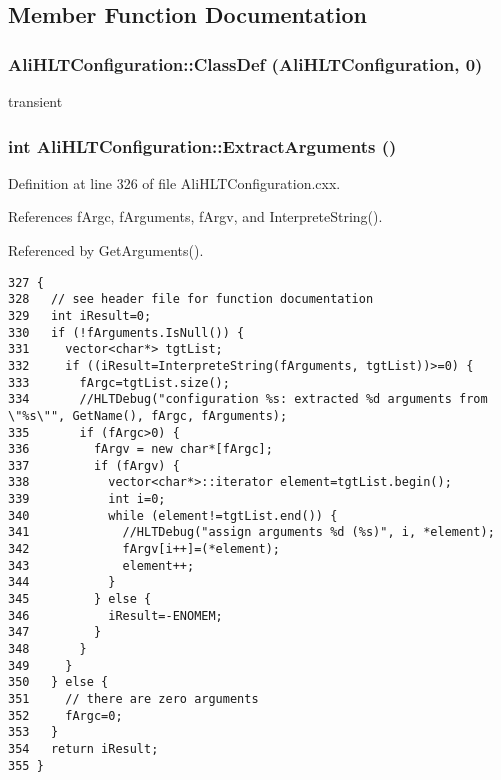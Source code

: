 \subsection{Member Function Documentation}
\subsubsection{\setlength{\rightskip}{0pt plus 5cm}Ali\-HLTConfiguration::Class\-Def ({\bf Ali\-HLTConfiguration}, 0)\hspace{0.3cm}{\tt  [private]}}\label{classAliHLTConfiguration_d3}


transient 

\subsubsection{\setlength{\rightskip}{0pt plus 5cm}int Ali\-HLTConfiguration::Extract\-Arguments ()\hspace{0.3cm}{\tt  [private]}}\label{classAliHLTConfiguration_d1}




Definition at line 326 of file Ali\-HLTConfiguration.cxx.

References f\-Argc, f\-Arguments, f\-Argv, and Interprete\-String().

Referenced by Get\-Arguments().

\footnotesize\begin{verbatim}327 {
328   // see header file for function documentation
329   int iResult=0;
330   if (!fArguments.IsNull()) {
331     vector<char*> tgtList;
332     if ((iResult=InterpreteString(fArguments, tgtList))>=0) {
333       fArgc=tgtList.size();
334       //HLTDebug("configuration %s: extracted %d arguments from \"%s\"", GetName(), fArgc, fArguments);
335       if (fArgc>0) {
336         fArgv = new char*[fArgc];
337         if (fArgv) {
338           vector<char*>::iterator element=tgtList.begin();
339           int i=0;
340           while (element!=tgtList.end()) {
341             //HLTDebug("assign arguments %d (%s)", i, *element);
342             fArgv[i++]=(*element);
343             element++;
344           }
345         } else {
346           iResult=-ENOMEM;
347         }
348       }
349     }
350   } else {
351     // there are zero arguments
352     fArgc=0;
353   }
354   return iResult;
355 }
\end{verbatim}\normalsize 


